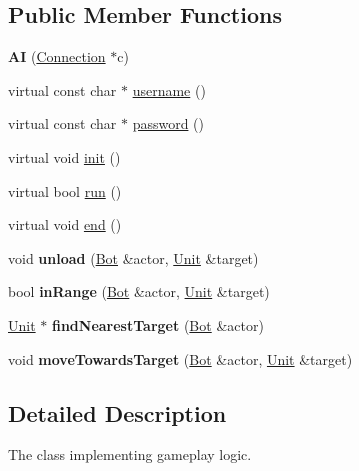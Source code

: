 \subsection*{Public Member Functions}
\begin{DoxyCompactItemize}
\item 
\hypertarget{classAI_ae37d6a193873f7e35deb19671bf45a14}{
{\bfseries AI} (\hyperlink{structConnection}{Connection} $\ast$c)}
\label{classAI_ae37d6a193873f7e35deb19671bf45a14}

\item 
virtual const char $\ast$ \hyperlink{classAI_a529ac74a6f88a82abb1edd87847203e1}{username} ()
\item 
virtual const char $\ast$ \hyperlink{classAI_aa4e58e11bbbdb040e6b12f8706763a00}{password} ()
\item 
virtual void \hyperlink{classAI_a8c8e3a635791abaa61585357e6a25f63}{init} ()
\item 
virtual bool \hyperlink{classAI_a3c4746756b699cee5225597506521a39}{run} ()
\item 
virtual void \hyperlink{classAI_a67b00a8dd5c6d73db2e4e2332826462e}{end} ()
\item 
\hypertarget{classAI_ac4f1565ad6e33d6999663baf20c11861}{
void {\bfseries unload} (\hyperlink{classBot}{Bot} \&actor, \hyperlink{classUnit}{Unit} \&target)}
\label{classAI_ac4f1565ad6e33d6999663baf20c11861}

\item 
\hypertarget{classAI_a50bee5fc94b1d2b12fe2d960f3ed074b}{
bool {\bfseries inRange} (\hyperlink{classBot}{Bot} \&actor, \hyperlink{classUnit}{Unit} \&target)}
\label{classAI_a50bee5fc94b1d2b12fe2d960f3ed074b}

\item 
\hypertarget{classAI_ac8cee3de4faa8cb0b446a8494752f4ac}{
\hyperlink{classUnit}{Unit} $\ast$ {\bfseries findNearestTarget} (\hyperlink{classBot}{Bot} \&actor)}
\label{classAI_ac8cee3de4faa8cb0b446a8494752f4ac}

\item 
\hypertarget{classAI_a0162d0d17ab9dc076785b14de0bc8c37}{
void {\bfseries moveTowardsTarget} (\hyperlink{classBot}{Bot} \&actor, \hyperlink{classUnit}{Unit} \&target)}
\label{classAI_a0162d0d17ab9dc076785b14de0bc8c37}

\end{DoxyCompactItemize}


\subsection{Detailed Description}
The class implementing gameplay logic. 

